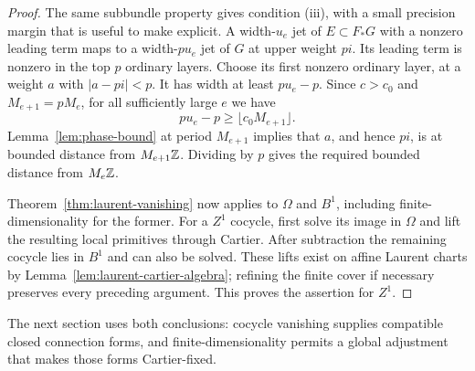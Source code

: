 \begin{proof}
The same subbundle property gives condition (iii), with a small
precision margin that is useful to make explicit.  A width-$u_e$
jet of $E\subset F_*G$ with a nonzero leading term maps to a
width-$pu_e$ jet of $G$ at upper weight $pi$.  Its leading term
is nonzero in the top $p$ ordinary layers.  Choose its first
nonzero ordinary layer, at a weight $a$ with $|a-pi|<p$.
It has width at least $pu_e-p$.  Since $c>c_0$ and
$M_{e+1}=pM_e$, for all sufficiently large $e$ we have
\[
 pu_e-p\ge\lfloor c_0M_{e+1}\rfloor.
\]
Lemma~\ref{lem:phase-bound} at period $M_{e+1}$ implies that $a$,
and hence $pi$, is at bounded distance from $M_{e+1}\mathbb Z$.
Dividing by $p$ gives the required bounded distance from $M_e\mathbb Z$.

Theorem~\ref{thm:laurent-vanishing} now applies to $\Omega$ and
$B^1$, including finite-dimensionality for the former.
For a $Z^1$ cocycle, first solve its image in $\Omega$ and lift
the resulting local primitives through Cartier.  After subtraction
the remaining cocycle lies in $B^1$ and can also be solved.
These lifts exist on affine Laurent charts by
Lemma~\ref{lem:laurent-cartier-algebra}; refining the finite cover
if necessary preserves every preceding argument.  This proves
the assertion for $Z^1$.
\end{proof}

The next section uses both conclusions: cocycle vanishing supplies
compatible closed connection forms, and finite-dimensionality permits
a global adjustment that makes those forms Cartier-fixed.
